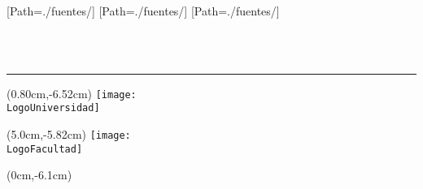 

\newfontfamily{}[Path=./fuentes/] 
\newfontfamily{}[Path=./fuentes/] 
\newfontfamily{}[Path=./fuentes/] 

\begin{titlepage}


\thispagestyle{empty}

\noindent\begin{minipage}{\textwidth}
\centering
 {\ArialMT\fontsize{20pt}{25pt}
 {
 {\MakeUppercase\Universidad}}}\\[0.5cm]
 {\ArialBoldMT\fontsize{14pt}{17pt}
 {}}\\[0.42cm] 
 {\ArialBoldMT\fontsize{13pt}{16pt}
 {}}
\noindent\rule[-0.22cm]{\textwidth}{5pt} %
\end{minipage}

\vfill

\begin{textblock*}{5cm}(0.80cm,-6.52cm)%
	 \texttt{[image: \\LogoUniversidad]}
\end{textblock*}
\begin{textblock*}{12cm}(5.0cm,-5.82cm)%
	 \texttt{[image: \\LogoFacultad]}
\end{textblock*}

\vfill

\begin{textblock*}{\textwidth}(0cm,-6.1cm)%
\noindent
\begin{minipage}{\textwidth}
\begin{spacing}{2.1}
 \centering
  {\fontsize{25pt}{30pt} \selectfont
  {\addfontfeature{}
    \titulo}}
\end{spacing}
\end{minipage}
\end{textblock*}


\end{titlepage}
